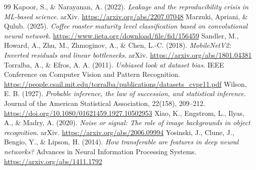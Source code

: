 \begin{thebibliography}{99}
 Kapoor, S., \& Narayanan, A. (2022). \textit{Leakage and the reproducibility crisis in ML-based science}. arXiv. \url{https://arxiv.org/abs/2207.07048}
 Marzuki, Apriani, \& Qulub. (2025). \textit{Coffee roaster maturity level classification based on convolutional neural network}. \url{https://www.iieta.org/download/file/fid/156459}
 Sandler, M., Howard, A., Zhu, M., Zhmoginov, A., \& Chen, L.-C. (2018). \textit{MobileNetV2: Inverted residuals and linear bottlenecks}. arXiv. \url{https://arxiv.org/abs/1801.04381}
 Torralba, A., \& Efros, A. A. (2011). \textit{Unbiased look at dataset bias}. IEEE Conference on Computer Vision and Pattern Recognition. \url{https://people.csail.mit.edu/torralba/publications/datasets_cvpr11.pdf}
 Wilson, E. B. (1927). \textit{Probable inference, the law of succession, and statistical inference}. Journal of the American Statistical Association, 22(158), 209--212. \url{https://doi.org/10.1080/01621459.1927.10502953}
 Xiao, K., Engstrom, L., Ilyas, A., \& Madry, A. (2020). \textit{Noise or signal: The role of image backgrounds in object recognition}. arXiv. \url{https://arxiv.org/abs/2006.09994}
 Yosinski, J., Clune, J., Bengio, Y., \& Lipson, H. (2014). \textit{How transferable are features in deep neural networks?} Advances in Neural Information Processing Systems. \url{https://arxiv.org/abs/1411.1792}
\end{thebibliography}
